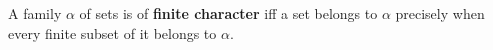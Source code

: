 A family $\alpha$ of sets is of \textbf{finite character} iff a set belongs to $\alpha$ precisely when every finite subset of it belongs to $\alpha$.
